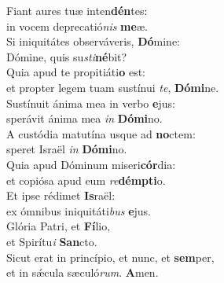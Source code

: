\evenverse Fiant aures tuæ inten\textbf{dén}tes:~\*\\
\evenverse in vocem deprecatió\textit{nis} \textbf{me}æ.\\
\oddverse Si iniquitátes observáveris, \textbf{Dó}mine:~\*\\
\oddverse Dómine, quis su\textit{sti}\textbf{né}bit?\\
\evenverse Quia apud te propitiáti\textbf{o} est:~\*\\
\evenverse et propter legem tuam sustínui \textit{te}, \textbf{Dó}\textbf{mi}ne.\\
\oddverse Sustínuit ánima mea in verbo \textbf{e}jus:~\*\\
\oddverse sperávit ánima mea \textit{in} \textbf{Dó}\textbf{mi}no.\\
\evenverse A custódia matutína usque ad \textbf{no}ctem:~\*\\
\evenverse speret Israël \textit{in} \textbf{Dó}\textbf{mi}no.\\
\oddverse Quia apud Dóminum miseri\textbf{cór}dia:~\*\\
\oddverse et copiósa apud eum \textit{re}\textbf{dém}\textbf{pti}o.\\
\evenverse Et ipse rédimet \textbf{Is}raël:~\*\\
\evenverse ex ómnibus iniquitáti\textit{bus} \textbf{e}jus.\\
\oddverse Glória Patri, et \textbf{Fí}lio,~\*\\
\oddverse et Spirítu\textit{i} \textbf{San}cto.\\
\evenverse Sicut erat in princípio, et nunc, et \textbf{sem}per,~\*\\
\evenverse et in sǽcula sæculó\textit{rum}. \textbf{A}men.\\

